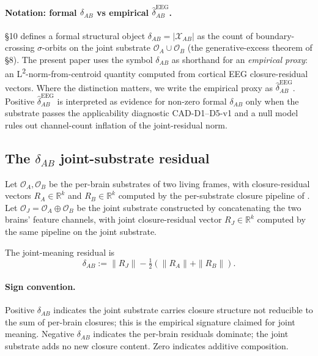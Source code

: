 \documentclass[11pt,a4paper]{article}
\begin{document}
\paragraph{Notation: formal $\delta_{AB}$ vs empirical $\widehat{\delta}_{AB}^{\mathrm{EEG}}$.} \citet{SmartLifeAsClosure} \S 10 defines a formal structural object $\delta_{AB} = |\mathcal{X}_{AB}|$ as the count of boundary-crossing $\sigma$-orbits on the joint substrate $\mathcal{O}_A \cup \mathcal{O}_B$ (the generative-excess theorem of \citet{SmartExistenceClosure} \S 8). The present paper uses the symbol $\delta_{AB}$ as shorthand for an \emph{empirical proxy}: an L\textsuperscript{2}-norm-from-centroid quantity computed from cortical EEG closure-residual vectors. Where the distinction matters, we write the empirical proxy as $\widehat{\delta}_{AB}^{\mathrm{EEG}}$. Positive $\widehat{\delta}_{AB}^{\mathrm{EEG}}$ is interpreted as evidence for non-zero formal $\delta_{AB}$ only when the substrate passes the applicability diagnostic CAD-D1--D5-v1 and a null model rules out channel-count inflation of the joint-residual norm.

\subsection{The $\delta_{AB}$ joint-substrate residual}\label{sec:methods-delta}

Let $\mathcal{O}_A, \mathcal{O}_B$ be the per-brain substrates of two living frames, with closure-residual vectors $R_A \in \mathbb{R}^k$ and $R_B \in \mathbb{R}^k$ computed by the per-substrate closure pipeline of \citep{SolutionLab002}. Let $\mathcal{O}_J = \mathcal{O}_A \oplus \mathcal{O}_B$ be the joint substrate constructed by concatenating the two brains' feature channels, with joint closure-residual vector $R_J \in \mathbb{R}^k$ computed by the same pipeline on the joint substrate.

The joint-meaning residual is
\[
  \delta_{AB} := \|R_J\| - \tfrac{1}{2}(\|R_A\| + \|R_B\|).
\]

\paragraph{Sign convention.} Positive $\delta_{AB}$ indicates the joint substrate carries closure structure not reducible to the sum of per-brain closures; this is the empirical signature claimed for joint meaning. Negative $\delta_{AB}$ indicates the per-brain residuals dominate; the joint substrate adds no new closure content. Zero indicates additive composition.
\end{document}

